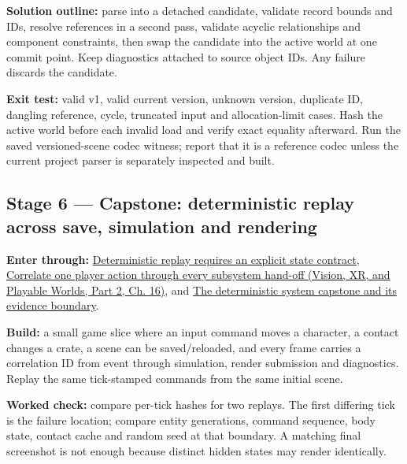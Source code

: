 \textbf{Solution outline:} parse into a detached candidate, validate record bounds and IDs, resolve references in a second pass, validate acyclic relationships and component constraints, then swap the candidate into the active world at one commit point. Keep diagnostics attached to source object IDs. Any failure discards the candidate.

\textbf{Exit test:} valid v1, valid current version, unknown version, duplicate ID, dangling reference, cycle, truncated input and allocation-limit cases. Hash the active world before each invalid load and verify exact equality afterward. Run the saved versioned-scene codec witness; report that it is a reference codec unless the current project parser is separately inspected and built.

\subsection{Stage 6 --- Capstone: deterministic replay across save, simulation and rendering}\label{06-engine-ii-ch042-stage-6-capstone-deterministic-replay-across-save-simulation-and-rendering}

\hypertarget{06-engine-ii-ch042-stage-6-capstone-deterministic-replay-across-save-simulation-and-rendering}{}

\textbf{Enter through:} \hyperref[06-engine-ii-ch042-deterministic-replay-requires-an-explicit-state-contract]{Deterministic replay requires an explicit state contract}, \href{../07-Vision-XR-and-Playable-Worlds-P02/main.pdf\#nameddest=06-engine-ii-ch041-correlate-one-player-action-through-every-subsystem-hand-off}{Correlate one player action through every subsystem hand-off (Vision, XR, and Playable Worlds, Part 2, Ch. 16)}, and \hyperref[06-engine-ii-ch042-the-deterministic-system-capstone-and-its-evidence-boundary]{The deterministic system capstone and its evidence boundary}.

\textbf{Build:} a small game slice where an input command moves a character, a contact changes a crate, a scene can be saved/reloaded, and every frame carries a correlation ID from event through simulation, render submission and diagnostics. Replay the same tick-stamped commands from the same initial scene.

\textbf{Worked check:} compare per-tick hashes for two replays. The first differing tick is the failure location; compare entity generations, command sequence, body state, contact cache and random seed at that boundary. A matching final screenshot is not enough because distinct hidden states may render identically.

